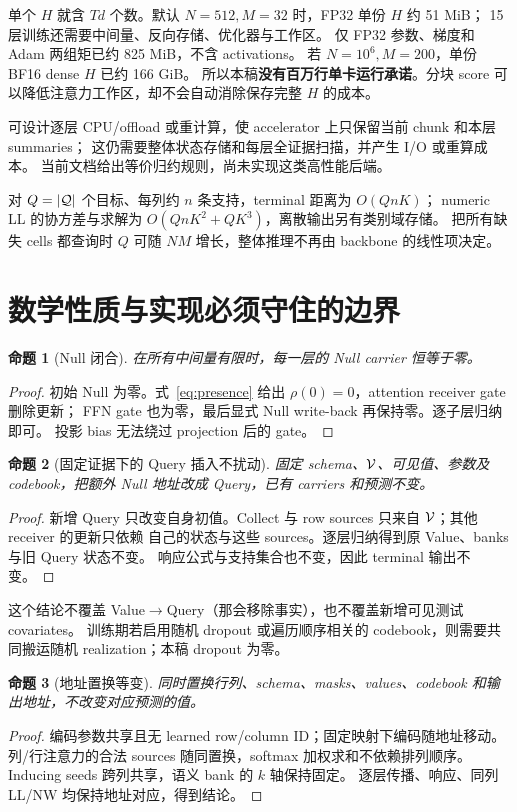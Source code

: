\documentclass[11pt,UTF8,fontset=fandol]{ctexart}
\newtheorem{proposition}{命题}[section]\renewcommand{\proofname}{证明}
\begin{document}
单个 $H$ 就含 $Td$ 个数。默认 $N=512,M=32$ 时，FP32 单份 $H$ 约 51 MiB；
15 层训练还需要中间量、反向存储、优化器与工作区。
仅 FP32 参数、梯度和 Adam 两组矩已约 825 MiB，不含 activations。
若 $N=10^6,M=200$，单份 BF16 dense $H$ 已约 166 GiB。
所以本稿\textbf{没有百万行单卡运行承诺}。分块 score 可以降低注意力工作区，却不会自动消除保存完整 $H$ 的成本。

可设计逐层 CPU/offload 或重计算，使 accelerator 上只保留当前 chunk 和本层 summaries；
这仍需要整体状态存储和每层全证据扫描，并产生 I/O 或重算成本。
当前文档给出等价归约规则，尚未实现这类高性能后端。

对 $Q=|\mathcal Q|$ 个目标、每列约 $n$ 条支持，terminal 距离为 $O(QnK)$；
numeric LL 的协方差与求解为 $O(QnK^2+QK^3)$，离散输出另有类别域存储。
把所有缺失 cells 都查询时 $Q$ 可随 $NM$ 增长，整体推理不再由 backbone 的线性项决定。

\section{数学性质与实现必须守住的边界}
\label{sec:properties}

\begin{proposition}[Null 闭合]
在所有中间量有限时，每一层的 Null carrier 恒等于零。
\end{proposition}
\begin{proof}
初始 Null 为零。式~\eqref{eq:presence} 给出 $\rho(0)=0$，attention receiver gate 删除更新；
FFN gate 也为零，最后显式 Null write-back 再保持零。逐子层归纳即可。
投影 bias 无法绕过 projection 后的 gate。
\end{proof}

\begin{proposition}[固定证据下的 Query 插入不扰动]
固定 schema、$\mathcal V$、可见值、参数及 codebook，把额外 Null 地址改成 Query，已有 carriers 和预测不变。
\end{proposition}
\begin{proof}
新增 Query 只改变自身初值。Collect 与 row sources 只来自 $\mathcal V$；其他 receiver 的更新只依赖
自己的状态与这些 sources。逐层归纳得到原 Value、banks 与旧 Query 状态不变。
响应公式与支持集合也不变，因此 terminal 输出不变。
\end{proof}

这个结论不覆盖 Value$\to$Query（那会移除事实），也不覆盖新增可见测试 covariates。
训练期若启用随机 dropout 或遍历顺序相关的 codebook，则需要共同搬运随机 realization；本稿 dropout 为零。

\begin{proposition}[地址置换等变]
同时置换行列、schema、masks、values、codebook 和输出地址，不改变对应预测的值。
\end{proposition}
\begin{proof}
编码参数共享且无 learned row/column ID；固定映射下编码随地址移动。
列/行注意力的合法 sources 随同置换，softmax 加权求和不依赖排列顺序。
Inducing seeds 跨列共享，语义 bank 的 $k$ 轴保持固定。
逐层传播、响应、同列 LL/NW 均保持地址对应，得到结论。
\end{proof}
\end{document}
